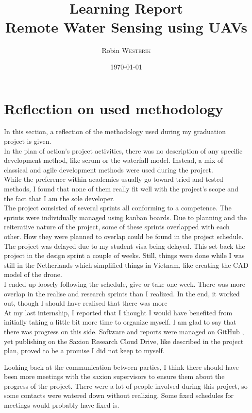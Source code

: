 \documentclass[11pt, a4paper]{article}
\title{Learning Report\\Remote Water Sensing using UAVs}
\author{Robin \textsc{Westerik}}
\date{\today}
\begin{document}


\tableofcontents
\pagebreak

\section{Reflection on used methodology}
In this section, a reflection of the methodology used during my graduation project is given.\\

\noindent In the plan of action's project activities, there was no description of any specific development method, like scrum or the waterfall model. Instead, a mix of classical and agile development methods were used during the project.\\

While the preference within academics usually go toward tried and tested methods, I found that none of them really fit well with the project's scope and the fact that I am the sole developer.\\

The project consisted of several sprints all conforming to a competence. The sprints were individually managed using kanban \cite{kanban} boards. Due to planning and the reiterative nature of the project, some of these sprints overlapped with each other. How they were planned to overlap could be found in the project schedule.\\

The project was delayed due to my student visa being delayed. This set back the project in the design sprint a couple of weeks. Still, things were done while I was still in the Netherlands which simplified things in Vietnam, like creating the CAD model of the drone.\\

I ended up loosely following the schedule, give or take one week. There was more overlap in the realise and research sprints than I realized. In the end, it worked out, though I should have realised that there was more \\

At my last internship, I reported that I thought I would have benefited from initially taking a little bit more time to organize myself. I am glad to say that there was progress on this side. Software and reports were managed on GitHub \cite{git}, yet publishing on the Saxion Research Cloud Drive, like described in the project plan, proved to be a promise I did not keep to myself. 

Looking back at the communication between parties, I think there should have been more meetings with the saxion supervisors to ensure them about the progress of the project. There were a lot of people involved during this project, so some contacts were watered down without realizing. Some fixed schedules for meetings would probably have fixed is.
\end{document}
